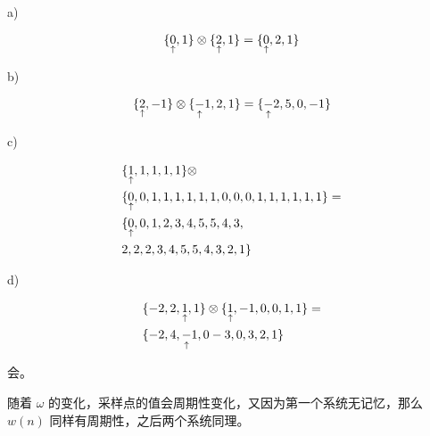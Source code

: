 \documentclass[lang=cn,11pt,a4paper,cite=authoryear]{elegantpaper}
\begin{document}
\begin{multicols*}{2}

a) 

\[\{\underset{\mathop{\uparrow}} 0 ,1\} \otimes \{\underset{\mathop{\uparrow}} 2, 1\} = \{\underset{\mathop{\uparrow}} 0,2,1\}\]

b)

\[\{\underset{\mathop{\uparrow}} 2, -1\} \otimes \{\underset{\mathop{\uparrow}} -1, 2, 1\} = \{\underset{\mathop{\uparrow}} -2, 5, 0, -1\}\]

c)

\[
    \begin{aligned}
        &\{\underset{\mathop{\uparrow}} 1,1,1,1,1\} \otimes \\
        & \{\underset{\mathop{\uparrow}}  0,0,1,1,1,1,1,1,0,0,0,1,1,1,1,1,1\} = \\
        & \{\underset{\mathop{\uparrow}} 0,0,1,2,3,4,5,5,4,3,\\
        & 2,2,2,3,4,5,5,4,3,2,1\}
    \end{aligned}
\]

d)



\[
\begin{aligned}
    &\{-2, 2, \underset{\mathop{\uparrow}} 1, 1\} \otimes \{\underset{\mathop{\uparrow}} 1, -1, 0, 0, 1, 1\} = \\
    & \{  -2,4  ,\underset{\mathop{\uparrow}} -1,0  -3,0,3,2,1\}
\end{aligned}    
\]


会。

随着 \(\omega\) 的变化，采样点的值会周期性变化，又因为第一个系统无记忆，那么 \(w(n)\) 同样有周期性，之后两个系统同理。

\end{multicols*}

\end{document}

